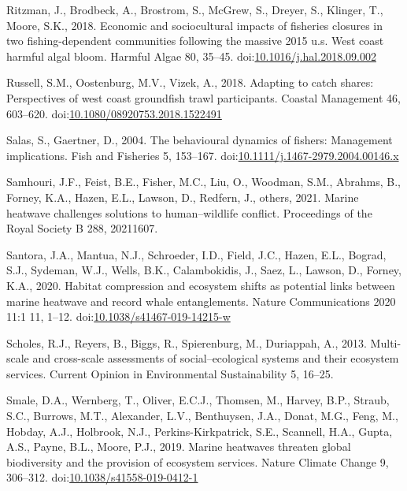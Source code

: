 \documentclass[]{elsarticle} %
\begin{document}
\leavevmode\hypertarget{ref-Ritzman2018}{}%
Ritzman, J., Brodbeck, A., Brostrom, S., McGrew, S., Dreyer, S.,
Klinger, T., Moore, S.K., 2018. Economic and sociocultural impacts of
fisheries closures in two fishing-dependent communities following the
massive 2015 u.s. West coast harmful algal bloom. Harmful Algae 80,
35--45.
doi:\href{https://doi.org/10.1016/j.hal.2018.09.002}{10.1016/j.hal.2018.09.002}

\leavevmode\hypertarget{ref-Russell2018}{}%
Russell, S.M., Oostenburg, M.V., Vizek, A., 2018. Adapting to catch
shares: Perspectives of west coast groundfish trawl participants.
Coastal Management 46, 603--620.
doi:\href{https://doi.org/10.1080/08920753.2018.1522491}{10.1080/08920753.2018.1522491}

\leavevmode\hypertarget{ref-Salas2004}{}%
Salas, S., Gaertner, D., 2004. The behavioural dynamics of fishers:
Management implications. Fish and Fisheries 5, 153--167.
doi:\href{https://doi.org/10.1111/j.1467-2979.2004.00146.x}{10.1111/j.1467-2979.2004.00146.x}

\leavevmode\hypertarget{ref-Samhouri2021}{}%
Samhouri, J.F., Feist, B.E., Fisher, M.C., Liu, O., Woodman, S.M.,
Abrahms, B., Forney, K.A., Hazen, E.L., Lawson, D., Redfern, J., others,
2021. Marine heatwave challenges solutions to human--wildlife conflict.
Proceedings of the Royal Society B 288, 20211607.

\leavevmode\hypertarget{ref-Santora2020}{}%
Santora, J.A., Mantua, N.J., Schroeder, I.D., Field, J.C., Hazen, E.L.,
Bograd, S.J., Sydeman, W.J., Wells, B.K., Calambokidis, J., Saez, L.,
Lawson, D., Forney, K.A., 2020. Habitat compression and ecosystem shifts
as potential links between marine heatwave and record whale
entanglements. Nature Communications 2020 11:1 11, 1--12.
doi:\href{https://doi.org/10.1038/s41467-019-14215-w}{10.1038/s41467-019-14215-w}

\leavevmode\hypertarget{ref-Scholes2013}{}%
Scholes, R.J., Reyers, B., Biggs, R., Spierenburg, M., Duriappah, A.,
2013. Multi-scale and cross-scale assessments of social--ecological
systems and their ecosystem services. Current Opinion in Environmental
Sustainability 5, 16--25.

\leavevmode\hypertarget{ref-Smale2019}{}%
Smale, D.A., Wernberg, T., Oliver, E.C.J., Thomsen, M., Harvey, B.P.,
Straub, S.C., Burrows, M.T., Alexander, L.V., Benthuysen, J.A., Donat,
M.G., Feng, M., Hobday, A.J., Holbrook, N.J., Perkins-Kirkpatrick, S.E.,
Scannell, H.A., Gupta, A.S., Payne, B.L., Moore, P.J., 2019. Marine
heatwaves threaten global biodiversity and the provision of ecosystem
services. Nature Climate Change 9, 306--312.
doi:\href{https://doi.org/10.1038/s41558-019-0412-1}{10.1038/s41558-019-0412-1}
\end{document}
